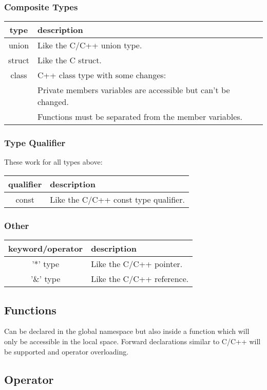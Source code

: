 \documentclass[10pt,a4paper]{article}
\begin{document}
\subsubsection{Composite Types}
\begin{tabular}{||c|l||}\hline
	type 		& description					\\ \hline \hline
	union 	& Like the C/C++ union type. 		\\
	struct 	& Like the C struct.		   		\\
	class 	& C++ class type with some changes:	\\
			&  Private members variables are accessible but can't be changed. \\
			&  Functions must be separated from the member variables. \\
	\hline
\end{tabular}
  

\subsubsection{Type Qualifier}
These work for all types above:\\
\begin{tabular}{||c|l||}\hline
	qualifier & description							\\ \hline \hline
	const 	& Like the C/C++ const type qualifier. 	\\
	\hline
\end{tabular}


\subsubsection{Other}
\begin{tabular}{||c|l||}\hline
	keyword/operator 	& description				\\ \hline \hline
	'*' type 			& Like the C/C++ pointer. 	\\
	'\&' type 			& Like the C/C++ reference. \\
	\hline
\end{tabular}


\subsection{Functions}
Can be declared in the global namespace but also inside a function which will only be accessible in the local space. Forward declarations similar to C/C++ will be supported and operator overloading.


\subsection{Operator}
\end{document}
